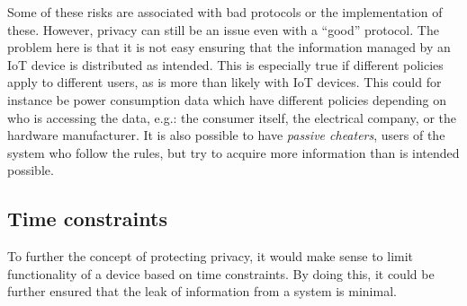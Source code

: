 Some of these risks are associated with bad protocols or the implementation of these.
However, privacy can still be an issue even with a ``good'' protocol.
The problem here is that it is not easy ensuring that the information managed by an IoT device is distributed as intended.
This is especially true if different policies apply to different users, as is more than likely with IoT devices.
This could for instance be power consumption data which have different policies depending on who is accessing the data, e.g.: the consumer itself, the electrical company, or the hardware manufacturer.
It is also possible to have \emph{passive cheaters}, users of the system who follow the rules, but try to acquire more information than is intended possible.

\subsection{Time constraints}
To further the concept of protecting privacy, it would make sense to limit functionality of a device based on time constraints.
By doing this, it could be further ensured that the leak of information from a system is minimal.
